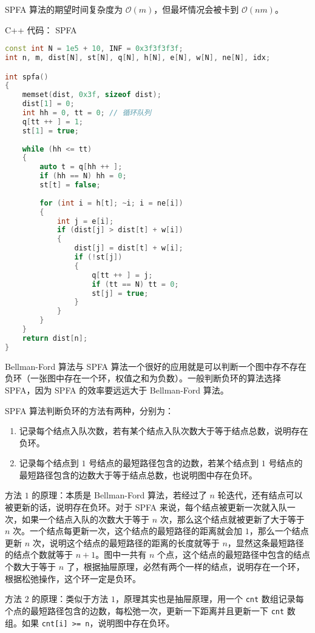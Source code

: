 SPFA 算法的期望时间复杂度为 $\mathcal{O}(m)$，但最坏情况会被卡到 $\mathcal{O}(nm)$。

C++ 代码：
SPFA

\begin{lstlisting}[language=cpp]
const int N = 1e5 + 10, INF = 0x3f3f3f3f;
int n, m, dist[N], st[N], q[N], h[N], e[N], w[N], ne[N], idx;

int spfa()
{
    memset(dist, 0x3f, sizeof dist);
    dist[1] = 0;
    int hh = 0, tt = 0; // 循环队列
    q[tt ++ ] = 1;
    st[1] = true;
    
    while (hh <= tt)
    {
        auto t = q[hh ++ ];
        if (hh == N) hh = 0;
        st[t] = false;
        
        for (int i = h[t]; ~i; i = ne[i])
        {
            int j = e[i];
            if (dist[j] > dist[t] + w[i])
            {
                dist[j] = dist[t] + w[i];
                if (!st[j])
                {
                    q[tt ++ ] = j;
                    if (tt == N) tt = 0;
                    st[j] = true;
                }
            }
        }
    }
    return dist[n];
}
\end{lstlisting}

Bellman-Ford 算法与 SPFA 算法一个很好的应用就是可以判断一个图中存不存在负环（一张图中存在一个环，权值之和为负数）。一般判断负环的算法选择 SPFA，因为 SPFA 的效率要远远大于 Bellman-Ford 算法。

SPFA 算法判断负环的方法有两种，分别为：

\begin{enumerate}
\item 记录每个结点入队次数，若有某个结点入队次数大于等于结点总数，说明存在负环。
\item 记录每个结点到 $1$ 号结点的最短路径包含的边数，若某个结点到 $1$ 号结点的最短路径包含的边数大于等于结点总数，也说明图中存在负环。
\end{enumerate}

方法 $1$ 的原理：本质是 Bellman-Ford 算法，若经过了 $n$ 轮迭代，还有结点可以被更新的话，说明存在负环。对于 SPFA 来说，每个结点被更新一次就入队一次，如果一个结点入队的次数大于等于 $n$ 次，那么这个结点就被更新了大于等于 $n$ 次。一个结点每更新一次，这个结点的最短路径的距离就会加 $1$，那么一个结点更新 $n$ 次，说明这个结点的最短路径的距离的长度就等于 $n$，显然这条最短路径的结点个数就等于 $n + 1$。图中一共有 $n$ 个点，这个结点的最短路径中包含的结点个数大于等于 $n$ 了，根据抽屉原理，必然有两个一样的结点，说明存在一个环，根据松弛操作，这个环一定是负环。

方法 $2$ 的原理：类似于方法 $1$，原理其实也是抽屉原理，用一个 \verb|cnt| 数组记录每个点的最短路径包含的边数，每松弛一次，更新一下距离并且更新一下 \verb|cnt| 数组。如果 \verb|cnt[i] >= n|，说明图中存在负环。

